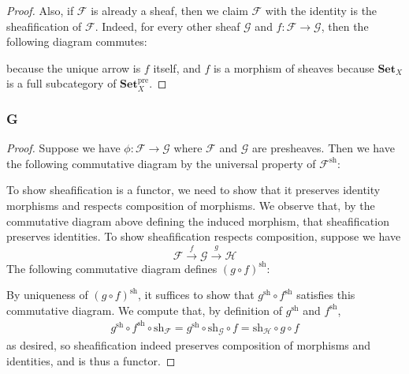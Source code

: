 \documentclass{article}
\newcommand{\id}{\mathrm{id}}
\newcommand{\fF}{\mathscr{F}}
\newcommand{\fG}{\mathscr{G}}
\newcommand{\fH}{\mathscr{H}}
\newcommand{\Set}{\mathbf{Set}} %
\begin{document}
\begin{proof}
    Also, if $\fF$ is already a sheaf, then we claim $\fF$ with the identity is the sheafification of $\fF$. Indeed, for every other sheaf $\fG$ and $f:\fF\to \fG$, then the following diagram commutes:
    \begin{center}
    \end{center}
    because the unique arrow is $f$ itself, and $f$ is a morphism of sheaves because $\Set_X$ is a full subcategory of $\Set^{\text{pre}}_X$.
\end{proof}
\subsubsection{G}\label{2.4.G}
\begin{proof}
    Suppose we have $\phi:\fF\to\fG$ where $\fF$ and $\fG$ are presheaves. Then we have the following commutative diagram by the universal property of $\fF^{\text{sh}}$:
    \begin{center}
    \end{center}
    To show sheafification is a functor, we need to show that it preserves identity morphisms and respects composition of morphisms. We observe that, by the commutative diagram above defining the induced morphism, that sheafification preserves identities. To show sheafification respects composition, suppose we have
    \[
    \fF \xrightarrow{f} \fG \xrightarrow{g} \fH
    \]
    The following commutative diagram defines $(g\circ f)^{\text{sh}}$:
    \begin{center}
    \end{center}
    By uniqueness of $(g\circ f)^\text{sh}$, it suffices to show that $g^\text{sh}\circ f^\text{sh}$ satisfies this commutative diagram. We compute that, by definition of $g^\text{sh}$ and $f^\text{sh}$,
    \begin{align*}
        g^\text{sh}\circ f^\text{sh}\circ \text{sh}_\fF=g^\text{sh}\circ \text{sh}_\fG \circ f=\text{sh}_\fH\circ g\circ f
    \end{align*}
    as desired, so sheafification indeed preserves composition of morphisms and identities, and is thus a functor.
\end{proof}
\end{document}
